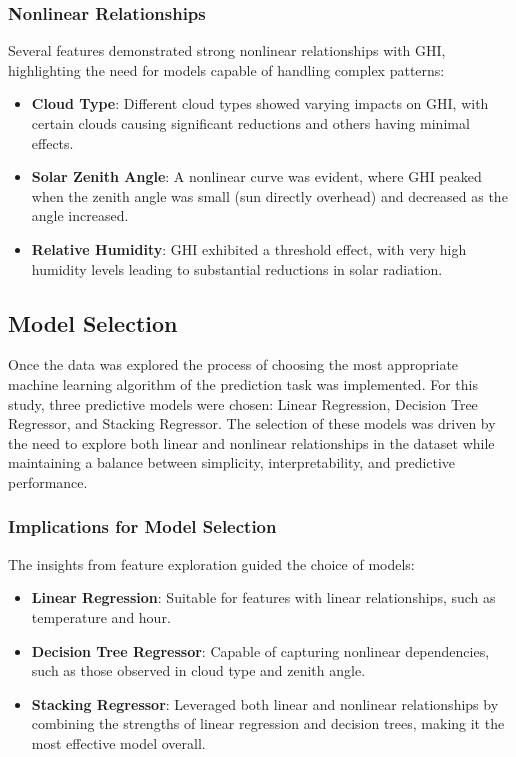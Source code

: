 \documentclass[10pt,twocolumn]{article}
\begin{document}
\begin{itemize}
\subsubsection{Nonlinear Relationships}
Several features demonstrated strong nonlinear relationships with GHI, highlighting the need for models capable of handling complex patterns:
\begin{itemize}
    \item \textbf{Cloud Type}: Different cloud types showed varying impacts on GHI, with certain clouds causing significant reductions and others having minimal effects.
    \item \textbf{Solar Zenith Angle}: A nonlinear curve was evident, where GHI peaked when the zenith angle was small (sun directly overhead) and decreased as the angle increased.
    \item \textbf{Relative Humidity}: GHI exhibited a threshold effect, with very high humidity levels leading to substantial reductions in solar radiation.
\end{itemize}


\subsection{Model Selection}
Once the data was explored  the process of choosing the  most appropriate machine learning algorithm of the prediction task was implemented. For this study,  three predictive models were chosen: Linear Regression, Decision Tree Regressor, and Stacking Regressor. The selection of these models was driven by the need to explore both linear and nonlinear relationships in the dataset while maintaining a balance between simplicity, interpretability, and predictive performance.
\subsubsection{Implications for Model Selection}
The insights from feature exploration guided the choice of models:
\begin{itemize}
    \item \textbf{Linear Regression}: Suitable for features with linear relationships, such as temperature and hour.
    \item \textbf{Decision Tree Regressor}: Capable of capturing nonlinear dependencies, such as those observed in cloud type and zenith angle.
    \item \textbf{Stacking Regressor}: Leveraged both linear and nonlinear relationships by combining the strengths of linear regression and decision trees, making it the most effective model overall.
\end{itemize}


\end{itemize}
\end{document}
